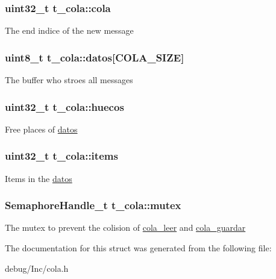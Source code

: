\subsubsection[{\texorpdfstring{cola}{cola}}]{\setlength{\rightskip}{0pt plus 5cm}uint32\+\_\+t t\+\_\+cola\+::cola}\hypertarget{structt__cola_a8b818616f62d19293390150f6c05b0c4}{}\label{structt__cola_a8b818616f62d19293390150f6c05b0c4}
The end indice of the new message 
\subsubsection[{\texorpdfstring{datos}{datos}}]{\setlength{\rightskip}{0pt plus 5cm}uint8\+\_\+t t\+\_\+cola\+::datos\mbox{[}{\bf C\+O\+L\+A\+\_\+\+S\+I\+ZE}\mbox{]}}\hypertarget{structt__cola_a61215b1ae633a2a4463e0abf0a796f41}{}\label{structt__cola_a61215b1ae633a2a4463e0abf0a796f41}
The buffer who stroes all messages 
\subsubsection[{\texorpdfstring{huecos}{huecos}}]{\setlength{\rightskip}{0pt plus 5cm}uint32\+\_\+t t\+\_\+cola\+::huecos}\hypertarget{structt__cola_aacfbba6a49f77a9a6f52a93c95808095}{}\label{structt__cola_aacfbba6a49f77a9a6f52a93c95808095}
Free places of \hyperlink{structt__cola_a61215b1ae633a2a4463e0abf0a796f41}{datos} 
\subsubsection[{\texorpdfstring{items}{items}}]{\setlength{\rightskip}{0pt plus 5cm}uint32\+\_\+t t\+\_\+cola\+::items}\hypertarget{structt__cola_af6a7ddbb78818f9185454bdda842a355}{}\label{structt__cola_af6a7ddbb78818f9185454bdda842a355}
Items in the \hyperlink{structt__cola_a61215b1ae633a2a4463e0abf0a796f41}{datos} 
\subsubsection[{\texorpdfstring{mutex}{mutex}}]{\setlength{\rightskip}{0pt plus 5cm}Semaphore\+Handle\+\_\+t t\+\_\+cola\+::mutex}\hypertarget{structt__cola_a6ab2b175f6265b861c97da1db60eaaf5}{}\label{structt__cola_a6ab2b175f6265b861c97da1db60eaaf5}
The mutex to prevent the colision of \hyperlink{group___cola___exported___functions___group2_ga12fe948f259d8c9d7a390a76c416b55c}{cola\+\_\+leer} and \hyperlink{group___cola___exported___functions___group2_gaa639dba8be8eec5d19259aeb8de2cd7a}{cola\+\_\+guardar} 

The documentation for this struct was generated from the following file\+:\begin{DoxyCompactItemize}
\item 
debug/\+Inc/cola.\+h\end{DoxyCompactItemize}
